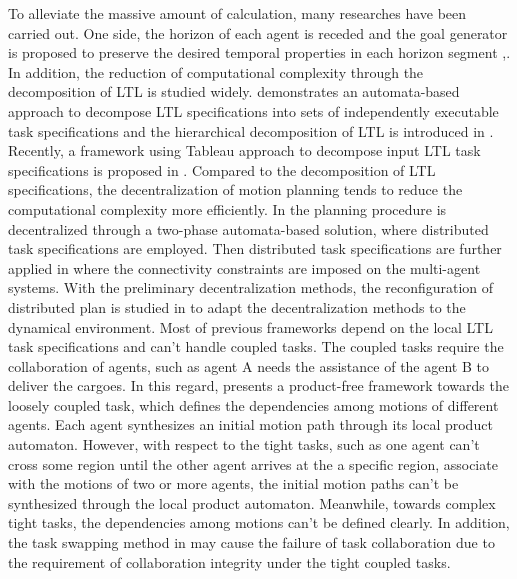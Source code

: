 \documentclass[journal]{IEEEtran}
\begin{document}

To alleviate the massive amount of calculation, many researches have been carried out. One side, the horizon of each agent is receded and the goal generator is proposed to preserve the desired temporal properties in each horizon segment \cite{wongpiromsarn2012receding},\cite{tumova2014receding}. In addition, the reduction of computational complexity through the decomposition of LTL is studied widely. \cite{schillinger2018decomposition} demonstrates an automata-based approach to decompose LTL specifications into sets of independently executable task specifications and the hierarchical decomposition of LTL is introduced in \cite{meyer2017hierarchical}. Recently, a framework using Tableau approach to decompose input LTL task specifications is proposed in \cite{al2018efficient}. Compared to the decomposition of LTL specifications, the decentralization of motion planning tends to reduce the computational complexity more efficiently. In \cite{tumova2015decomposition} the planning procedure is decentralized through a two-phase automata-based solution, where distributed task specifications are employed. Then distributed task specifications are further applied in \cite{guo2014cooperative} where the connectivity constraints are imposed on the multi-agent systems. With the preliminary decentralization methods, the reconfiguration of distributed plan is studied in \cite{guo2014distributed} to adapt the decentralization methods to the dynamical environment. Most of previous frameworks depend on the local LTL task specifications and can't handle coupled tasks. The coupled tasks require the collaboration of agents, such as agent A needs the assistance of the agent B to deliver the cargoes. In this regard, \cite{guo2017task} presents a product-free framework towards the loosely coupled task, which defines the dependencies among motions of different agents. Each agent synthesizes an initial motion path through its local product automaton. However, with respect to the tight tasks, such as one agent can't cross some region until the other agent arrives at the a specific region, associate with the motions of two or more agents, the initial motion paths can't be synthesized through the local product automaton. Meanwhile, towards complex tight tasks, the dependencies among motions can't be defined clearly. In addition, the task swapping method in \cite{guo2017task} may cause the failure of task collaboration due to the requirement of collaboration integrity under the tight coupled tasks.
\end{document}
